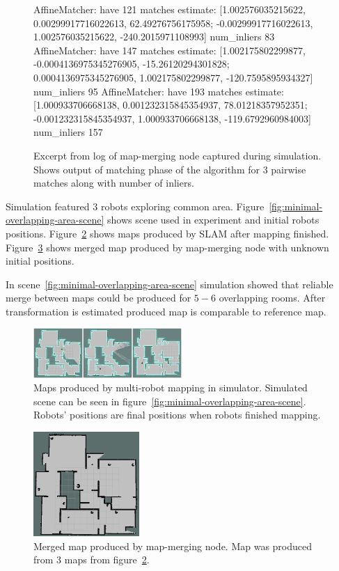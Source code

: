 \begin{figure}
    \centering
	\begin{code}
AffineMatcher: have 121 matches
estimate:
[1.002576035215622, 0.00299917716022613, 62.49276756175958;
 -0.00299917716022613, 1.002576035215622, -240.2015971108993]
num_inliers 83
AffineMatcher: have 147 matches
estimate:
[1.002175802299877, -0.0004136975345276905, -15.26120294301828;
 0.0004136975345276905, 1.002175802299877, -120.7595895934327]
num_inliers 95
AffineMatcher: have 193 matches
estimate:
[1.000933706668138, 0.001232315845354937, 78.01218357952351;
 -0.001232315845354937, 1.000933706668138, -119.6792960984003]
num_inliers 157
	\end{code}
    \caption{Excerpt from log of map-merging node captured during simulation. Shows output of matching phase of the algorithm for $3$ pairwise matches along with number of inliers.}
    \label{fig:minimal-overlapping-area-log}
\end{figure}


Simulation featured $3$ robots exploring common area. Figure~\ref{fig:minimal-overlapping-area-scene} shows scene used in experiment and initial robots positions. Figure~\ref{fig:minimal-overlapping-area-final-maps} shows maps produced by \gls{SLAM} after mapping finished. Figure~\ref{fig:minimal-overlapping-area-merged-map} shows merged map produced by map-merging node with unknown initial positions.

In scene~\ref{fig:minimal-overlapping-area-scene} simulation showed that reliable merge between maps could be produced for $5-6$ overlapping rooms. After transformation is estimated produced map is comparable to reference map.

\begin{figure}
    \centering
    \includegraphics[width=2.22in]{../img/minimal-overlapping-area-final-maps.png}
    \caption{Maps produced by multi-robot mapping in simulator. Simulated scene can be seen in figure~\ref{fig:minimal-overlapping-area-scene}. Robots' positions are final positions when robots finished mapping.}
    \label{fig:minimal-overlapping-area-final-maps}
\end{figure}

\begin{figure}
    \centering
    \includegraphics[width=1.58in]{../img/minimal-overlapping-area-merged-map.png}
    \caption{Merged map produced by map-merging node. Map was produced from $3$ maps from figure~\ref{fig:minimal-overlapping-area-final-maps}.}
    \label{fig:minimal-overlapping-area-merged-map}
\end{figure}

